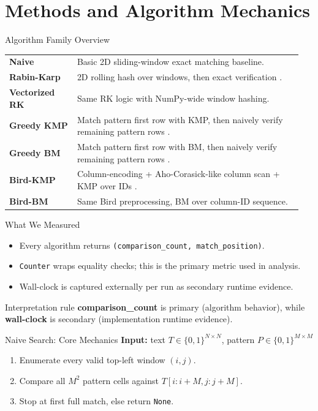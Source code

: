 \section{Methods and Algorithm Mechanics}

\begin{frame}{Algorithm Family Overview}
\small
\begin{tabular}{>{\bfseries}p{0.22\linewidth}p{0.73\linewidth}}
Naive & Basic 2D sliding-window exact matching baseline. \\
Rabin-Karp & 2D rolling hash over windows, then exact verification \cite{karp1987rabin}. \\
Vectorized RK & Same RK logic with NumPy-wide window hashing. \\
Greedy KMP & Match pattern first row with KMP, then naively verify remaining pattern rows \cite{knuth1977fast}. \\
Greedy BM & Match pattern first row with BM, then naively verify remaining pattern rows \cite{boyer1977fast}. \\
Bird-KMP & Column-encoding + Aho-Corasick-like column scan + KMP over IDs \cite{bird1977twod,aho1975efficient}. \\
Bird-BM & Same Bird preprocessing, BM over column-ID sequence. \\
\end{tabular}
\end{frame}

\begin{frame}{What We Measured}
\begin{itemize}
  \item Every algorithm returns \texttt{(comparison\_count, match\_position)}.
  \item \texttt{Counter} wraps equality checks; this is the primary metric used in analysis.
  \item Wall-clock is captured externally per run as secondary runtime evidence.
\end{itemize}
\begin{block}{Interpretation rule}
\small
\textbf{comparison\_count} is primary (algorithm behavior), while \textbf{wall-clock} is secondary (implementation runtime evidence).
\end{block}
\end{frame}

\begin{frame}{Naive Search: Core Mechanics}
\small
\textbf{Input:} text \(T\in\{0,1\}^{N\times N}\), pattern \(P\in\{0,1\}^{M\times M}\)
\begin{enumerate}
  \item Enumerate every valid top-left window \((i,j)\).
  \item Compare all \(M^2\) pattern cells against \(T[i:i+M, j:j+M]\).
  \item Stop at first full match, else return \texttt{None}.
\end{enumerate}
\end{frame}

